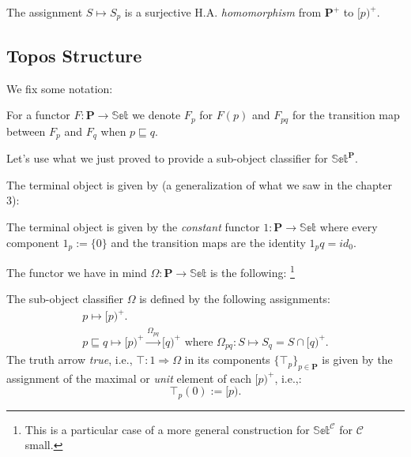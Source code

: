 \begin{prop}
	The assignment $S \mapsto S_p$ is a surjective H.A. \emph{homomorphism} from $\textbf{P}^+$ to $[p)^+$. 
\end{prop}

\newpage
\subsection{Topos Structure}

We fix some notation:
\begin{remark}
For a functor $F: \textbf{P} \rightarrow \mathbb{Set}$ we denote $F_p$ for $F(p)$ and $F_{pq}$ for the transition map between $F_p$ and $F_q$ when $p \sqsubseteq q$.
\end{remark}

Let's use what we just proved to provide a sub-object classifier for $\mathbb{Set}^\textbf{P}$. \newline

The terminal object is  given by (a generalization of what we saw in the chapter 3):

\begin{lem}
	The terminal object is given by the \emph{constant} functor $1: \textbf{P} \rightarrow \mathbb{Set}$
	where every component $1_p := \{0\}$ and the transition maps are the identity $1_pq = id_{0}$.
\end{lem}

The functor we have in mind $\Omega: \textbf{P} \rightarrow \mathbb{Set}$ is the following: \footnote{This is a particular case of a more general construction for $\mathbb{Set}^\mathcal{C}$ for $\mathcal{C}$ small. }

\begin{lem}
	The sub-object classifier $\Omega$ is defined by the following assignments:
	\begin{gather*}
		p \mapsto [p)^+. \\
		p \sqsubseteq q \mapsto [p)^+ \xrightarrow{\Omega_{pq}} [q)^+ \text{ where }
		 \Omega_{pq} : S \mapsto S_q = S \cap [q)^+.
	\end{gather*}
	The truth arrow \emph{true}, i.e.,  $\top : 1 \Rightarrow \Omega$ in its components $\{\top_p\}_{p\in \textbf{P}}$ is given by the assignment of the maximal or \emph{unit} element of each $[p)^+$, i.e.,:
	\begin{equation*}
		\top_p(0) := [p).
	\end{equation*}
\end{lem}

